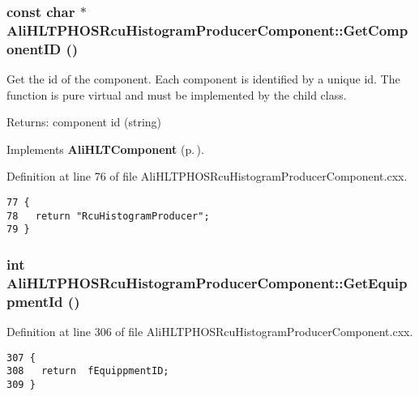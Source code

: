 \subsubsection{\setlength{\rightskip}{0pt plus 5cm}const char $\ast$ Ali\-HLTPHOSRcu\-Histogram\-Producer\-Component::Get\-Component\-ID ()\hspace{0.3cm}{\tt  [virtual]}}\label{classAliHLTPHOSRcuHistogramProducerComponent_a10}


Get the id of the component. Each component is identified by a unique id. The function is pure virtual and must be implemented by the child class. \begin{Desc}
\item[Returns:]component id (string) \end{Desc}


Implements {\bf Ali\-HLTComponent} {\rm (p.\,\pageref{classAliHLTComponent_a9})}.

Definition at line 76 of file Ali\-HLTPHOSRcu\-Histogram\-Producer\-Component.cxx.

\footnotesize\begin{verbatim}77 {
78   return "RcuHistogramProducer";
79 }
\end{verbatim}\normalsize 


\subsubsection{\setlength{\rightskip}{0pt plus 5cm}int Ali\-HLTPHOSRcu\-Histogram\-Producer\-Component::Get\-Equippment\-Id ()}\label{classAliHLTPHOSRcuHistogramProducerComponent_a11}




Definition at line 306 of file Ali\-HLTPHOSRcu\-Histogram\-Producer\-Component.cxx.

\footnotesize\begin{verbatim}307 {
308   return  fEquippmentID;
309 }
\end{verbatim}\normalsize 


